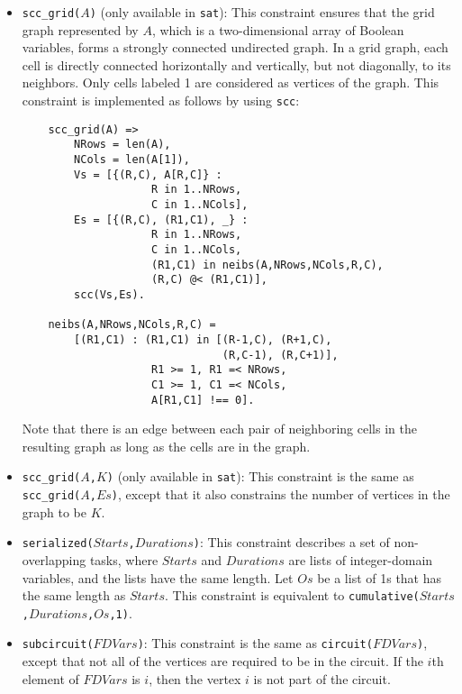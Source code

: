 \begin{itemize}
\item \texttt{scc\_grid($A$)} (only available in \texttt{sat}):  This constraint ensures that the grid graph represented by $A$, which is a two-dimensional array of Boolean variables, forms a strongly connected undirected graph. In a grid graph, each cell is directly connected horizontally and vertically, but not diagonally, to its neighbors. Only cells labeled 1 are considered as vertices of the graph. This constraint is implemented as follows by using \texttt{scc}:
\begin{verbatim}
    scc_grid(A) =>
        NRows = len(A),
        NCols = len(A[1]),
        Vs = [{(R,C), A[R,C]} : 
                    R in 1..NRows, 
                    C in 1..NCols],
        Es = [{(R,C), (R1,C1), _} : 
                    R in 1..NRows, 
                    C in 1..NCols,
                    (R1,C1) in neibs(A,NRows,NCols,R,C),
                    (R,C) @< (R1,C1)],
        scc(Vs,Es).

    neibs(A,NRows,NCols,R,C) = 
        [(R1,C1) : (R1,C1) in [(R-1,C), (R+1,C), 
                               (R,C-1), (R,C+1)],
                    R1 >= 1, R1 =< NRows,
                    C1 >= 1, C1 =< NCols, 
                    A[R1,C1] !== 0].
\end{verbatim}
Note that there is an edge between each pair of neighboring cells in the resulting graph as long as the cells are in the graph.

\item \texttt{scc\_grid($A$,$K$)} (only available in \texttt{sat}): This constraint is the same as \texttt{scc\_grid($A$,$Es$)}, except that it also constrains the number of vertices in the graph to be $K$. 

\item \texttt{serialized($Starts$,$Durations$)}: This constraint describes a set of non-overlapping tasks, where $Starts$ and $Durations$ are lists of integer-domain variables, and the lists have the same length. Let $Os$ be a list of 1s that has the same length as $Starts$. This constraint is equivalent to \texttt{cumulative($Starts$,$Durations$,$Os$,1)}.

\item \texttt{subcircuit($FDVars$)}: This constraint is the same as \texttt{circuit($FDVars$)}, except that not all of the vertices are required to be in the circuit. If the $i$th element of $FDVars$ is $i$, then the vertex $i$ is not part of the circuit. 


\end{itemize}
